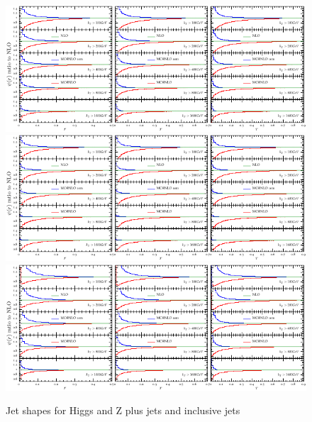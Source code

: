 \documentclass[aps,prd,onecolumn,fleqn,superscriptaddress,groupedaddress,nofootinbib,preprintnumbers,nobalancelastpage]{revtex4}
\begin{document}
\begin{figure}
\includegraphics[width=\textwidth]{plots/shapes/hj/hjshapes-crop.pdf}\\
\includegraphics[width=\textwidth]{plots/shapes/zj/zjshapes-crop.pdf}\\
\includegraphics[width=\textwidth]{plots/shapes/jj/jjshapes-crop.pdf}
\caption{Jet shapes for Higgs and Z plus jets and inclusive jets}
\end{figure}
\end{document}
